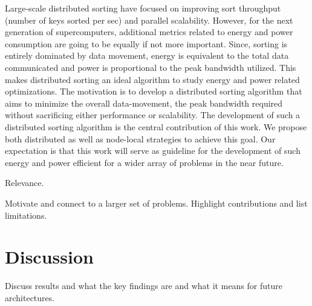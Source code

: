 \documentclass[10pt, conference, compsocconf]{IEEEtran}
\begin{document}
Large-scale distributed sorting have focused on improving sort throughput (number of keys sorted per sec) and parallel scalability. However, for the next generation of supercomputers, additional metrics related to energy and power consumption are going to be equally if not more important. Since, sorting is entirely dominated by data movement, energy is equivalent to the total data communicated and power is proportional to the peak bandwidth utilized. This makes distributed sorting an ideal algorithm to study energy and power related optimizations. The motivation is to develop a distributed sorting algorithm that aims to minimize the overall data-movement, the peak bandwidth required without sacrificing either performance or scalability. The development of such a distributed sorting algorithm is the central contribution of this work. We propose both distributed as well as node-local strategies to achieve this goal. Our expectation is that this work will serve as guideline for the development of such energy and power efficient for a wider array of problems in the near future.

Relevance. 
 
Motivate and connect to a larger set of problems. Highlight contributions and list limitations.







\section{Discussion}
Discuss results and what the key findings are and what it means for future architectures.





%

 

\end{document}
